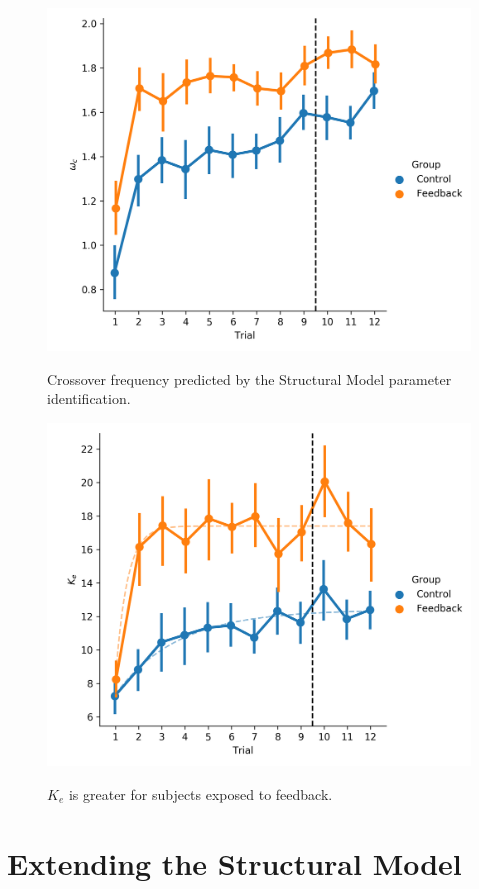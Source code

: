 \begin{figure}[t]
    \centering
    \centering
    \includegraphics[width=0.8\linewidth]{figures/Modeling/wc_group.png}
    \label{fig:sm_crossover}
    \caption[Crossover frequency (Structural Model)]{Crossover frequency predicted by the Structural Model parameter identification.}
\end{figure}

\begin{figure}[t]
    \centering
    \centering
    \includegraphics[width=0.8\linewidth]{figures/Modeling/ke_group.png}
    \label{fig:ke_group}
    \caption[$K_e$ is greater for subjects exposed to feedback]{$K_e$ is greater for subjects exposed to feedback.}
\end{figure}

\section{Extending the Structural Model}

